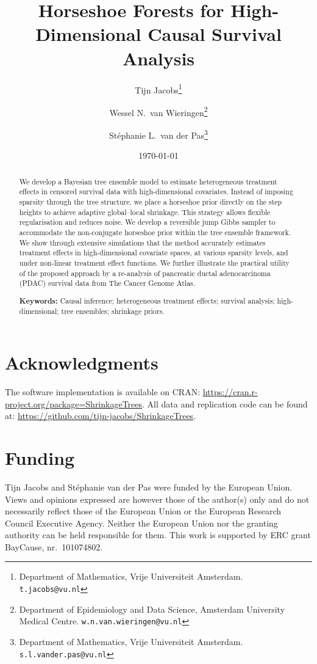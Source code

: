 \documentclass[11pt]{article}
\title{Horseshoe Forests for High-Dimensional Causal Survival Analysis}
\author{
  Tijn Jacobs\thanks{Department of Mathematics, Vrije Universiteit Amsterdam. \texttt{t.jacobs@vu.nl}} \and
  Wessel N.\ van Wieringen\thanks{Department of Epidemiology and Data Science, Amsterdam University Medical Centre. \texttt{w.n.van.wieringen@vu.nl}} \and
  St\'ephanie L.\ van der Pas\thanks{Department of Mathematics, Vrije Universiteit Amsterdam. \texttt{s.l.vander.pas@vu.nl}}
}
\date{\today}
\theoremstyle{plain}
\theoremstyle{definition}
\theoremstyle{remark}
\newcommand{\1}{\mathds{1}}
\begin{document}
\maketitle

\begin{abstract}
We develop a Bayesian tree ensemble model to estimate heterogeneous treatment effects in censored survival data with high-dimensional covariates.
Instead of imposing sparsity through the tree structure, we place a horseshoe prior directly on the step heights to achieve adaptive global--local shrinkage.
This strategy allows flexible regularisation and reduces noise.
We develop a reversible jump Gibbs sampler to accommodate the non-conjugate horseshoe prior within the tree ensemble framework.
We show through extensive simulations that the method accurately estimates treatment effects in high-dimensional covariate spaces, at various sparsity levels, and under non-linear treatment effect functions.
We further illustrate the practical utility of the proposed approach by a re-analysis of pancreatic ductal adenocarcinoma (PDAC) survival data from The Cancer Genome Atlas.

\medskip
\noindent\textbf{Keywords:} Causal inference; heterogeneous treatment effects; survival analysis; high-dimensional; tree ensembles; shrinkage priors.
\end{abstract}










\section*{Acknowledgments}
The software implementation is available on CRAN: \url{https://cran.r-project.org/package=ShrinkageTrees}.
All data and replication code can be found at: \url{https://github.com/tijn-jacobs/ShrinkageTrees}.

\section*{Funding}
Tijn Jacobs and St\'ephanie van der Pas were funded by the European Union.
Views and opinions expressed are however those of the author(s) only and do not necessarily reflect those of the European Union or the European Research Council Executive Agency.
Neither the European Union nor the granting authority can be held responsible for them.
This work is supported by ERC grant BayCause, nr.\ 101074802.
\end{document}
